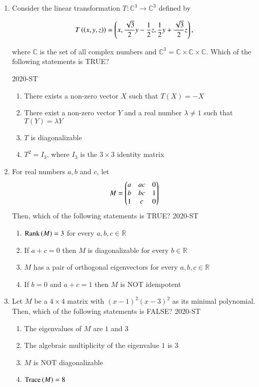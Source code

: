 \documentclass[journal]{IEEEtran}
\begin{document}
\begin{enumerate}

\item Consider the linear transformation  $T : \mathbb{C}^3 \rightarrow \mathbb{C}^3$  defined by

\begin{align*}
T\left(\left(x, y, z\right)\right) = \left( x, \frac{\sqrt{3}}{2} y - \frac{1}{2} z, \frac{1}{2} y + \frac{\sqrt{3}}{2} z \right),
\end{align*}

where  $\mathbb{C}$ is the set of all complex numbers and  $\mathbb{C}^3 = \mathbb{C} \times \mathbb{C} \times \mathbb{C} $. Which of the following statements is TRUE?

\hfill{2020-ST}

\begin{enumerate}
    \item There exists a non-zero vector  $X$ such that  $T(X) = -X$
    \item There exist a non-zero vector $Y $ and a real number  $\lambda \neq 1$ such that  $T(Y) = \lambda Y$
    \item  $T$ is diagonalizable
    \item  $T^2 = I_3$, where $I_3$ is the  $3 \times 3$ identity matrix
\end{enumerate}

\item For real numbers  $a, b$ and  $c$, let
\begin{align*}
M = \begin{pmatrix}a & ac & 0 \\ b & bc & 1 \\ 1 & c & 0\end{pmatrix}
\end{align*}
Then, which of the following statements is TRUE?
\hfill{2020-ST}
\begin{enumerate}
    \item  $\text{Rank}\left(M\right) = 3 $ for every  $a, b, c \in \mathbb{R}$
    \item If  $a + c = 0$ then  $M$ is diagonalizable for every  $b \in \mathbb{R}$
    \item  $M$ has a pair of orthogonal eigenvectors for every  $a, b, c \in \mathbb{R}$
    \item If  $b = 0$ and  $a + c = 1$ then  $M$ is NOT idempotent
\end{enumerate}

\item Let  $M$ be a  $4 \times 4$ matrix with  $(x - 1)^2(x - 3)^2$ as its minimal polynomial. Then, which of the following statements is FALSE?
\hfill{2020-ST}
\begin{enumerate}
    \item The eigenvalues of  $M$ are $1$ and $3$
    \item The algebraic multiplicity of the eigenvalue $1$ is $3$
    \item $M$ is NOT diagonalizable
    \item $\text{Trace}\left(M\right) = 8$
\end{enumerate}


\end{enumerate}
\end{document}
